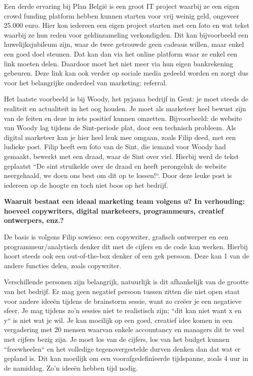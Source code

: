 	Een derde ervaring bij Plan België is een groot IT project waarbij ze een eigen crowd funding platform hebben kunnen starten voor vrij weinig geld, ongeveer 25.000 euro. Hier kon iedereen een eigen project starten met een foto en wat tekst waarbij ze hun reden voor geldinzameling verkondigden. Dit kan bijvoorbeeld een huwelijksjubileum zijn, waar de twee getrouwde geen cadeaus willen, maar enkel een goed doel steunen. Dat kan dan via het online platform waar ze enkel een link moeten delen. Daardoor moet het niet meer via hun eigen bankrekening gebeuren. Deze link kan ook verder op sociale media gedeeld worden en zorgt dus voor het belangrijke onderdeel van marketing: referral.
	
	Het laatste voorbeeld is bij Woody, het pyjama bedrijf in Gent: je moet steeds de realiteit en actualiteit in het oog houden. Je moet als marketeer heel bewust zijn van de feiten en deze in iets positief kunnen omzetten. Bijvoorbeeld: de website van Woody lag tijdens de Sint-periode plat, door een technisch probleem. Als digital marketeer kan je hier heel leuk mee omgaan, zoals Filip deed, met een ludieke post. Filip heeft een foto van de Sint, die iemand voor Woody had gemaakt, bewerkt met een draad, waar de Sint over viel. Hierbij werd de tekst geplaatst ``De sint struikelde over de draad en heeft perongeluk de website neergehaald, we doen ons best om dit op te lossen!``. Door deze leuke post is iedereen op de hoogte en toch niet boos op het bedrijf.
	
\textbf{Waaruit bestaat een ideaal marketing team volgens u? In verhouding: hoeveel copywriters, digital marketeers, programmeurs, creatief ontwerpers, enz.?}
	
	De basis is volgens Filip sowieso: een copywriter, grafisch ontwerper en een programmeur/analytisch denker dit met de cijfers en de code kan werken. Hierbij hoort steeds ook een out-of-the-box denker of een gek persoon. Deze kan 1 van de andere functies delen, zoals copywriter.	
	
	Verschillende personen zijn belangrijk, natuurlijk is dit afhankelijk van de grootte van het bedrijf. Er mag geen negatief persoon tussen zitten die niet open staat voor andere ideeën tijdens de brainstorm sessie, want zo creëer je een negatieve sfeer. Je mag tijdens zo'n sessies niet te realistisch zijn; ``dit kan niet want x en y`` is niet wat je wil. Je kan moeilijk op een goed, creatief idee komen in een vergadering met 20 mensen waarvan enkele accountancy en managers dit te veel met cijfers bezig zijn. Je moet los van de cijfers, los van het budget kunnen ``freewheelen`` en het volledige tegenovergestelde durven denken dan dat wat er gepland is. Dit kan moeilijk om een voorafgedefinïeerde tijdspanne, zoals 4 uur in de namiddag. Zo'n ideeën hebben tijd nodig.
	
